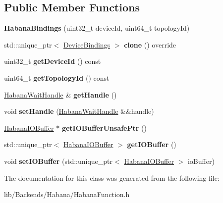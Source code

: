 \subsection*{Public Member Functions}
\begin{DoxyCompactItemize}
\item 
\mbox{\label{classglow_1_1_habana_bindings_a5a03c51cc59908850ff4c99247d61c4d}} 
{\bfseries Habana\+Bindings} (uint32\+\_\+t device\+Id, uint64\+\_\+t topology\+Id)
\item 
\mbox{\label{classglow_1_1_habana_bindings_adb7ef2df38d7df57f3235f39632c02cd}} 
std\+::unique\+\_\+ptr$<$ \hyperlink{classglow_1_1_device_bindings}{Device\+Bindings} $>$ {\bfseries clone} () override
\item 
\mbox{\label{classglow_1_1_habana_bindings_a6b715e265aacb3ab513d3fbfe174bf6f}} 
uint32\+\_\+t {\bfseries get\+Device\+Id} () const
\item 
\mbox{\label{classglow_1_1_habana_bindings_a046daf74d727c485eb2ec907f2b0bf63}} 
uint64\+\_\+t {\bfseries get\+Topology\+Id} () const
\item 
\mbox{\label{classglow_1_1_habana_bindings_a6e16d1ab73496b38a422493637e5acd0}} 
\hyperlink{classglow_1_1_habana_wait_handle}{Habana\+Wait\+Handle} \& {\bfseries get\+Handle} ()
\item 
\mbox{\label{classglow_1_1_habana_bindings_a87b7430ab4b8050de0088d894863e17b}} 
void {\bfseries set\+Handle} (\hyperlink{classglow_1_1_habana_wait_handle}{Habana\+Wait\+Handle} \&\&handle)
\item 
\mbox{\label{classglow_1_1_habana_bindings_a2894065af0dc6602aa3f0b9d8ee189ff}} 
\hyperlink{classglow_1_1_habana_i_o_buffer}{Habana\+I\+O\+Buffer} $\ast$ {\bfseries get\+I\+O\+Buffer\+Unsafe\+Ptr} ()
\item 
\mbox{\label{classglow_1_1_habana_bindings_a6690f88652714ee397678c7030e16b52}} 
std\+::unique\+\_\+ptr$<$ \hyperlink{classglow_1_1_habana_i_o_buffer}{Habana\+I\+O\+Buffer} $>$ {\bfseries get\+I\+O\+Buffer} ()
\item 
\mbox{\label{classglow_1_1_habana_bindings_a7303191ba7e9718a4ab865e5cdc7e05c}} 
void {\bfseries set\+I\+O\+Buffer} (std\+::unique\+\_\+ptr$<$ \hyperlink{classglow_1_1_habana_i_o_buffer}{Habana\+I\+O\+Buffer} $>$ io\+Buffer)
\end{DoxyCompactItemize}


The documentation for this class was generated from the following file\+:\begin{DoxyCompactItemize}
\item 
lib/\+Backends/\+Habana/Habana\+Function.\+h\end{DoxyCompactItemize}
